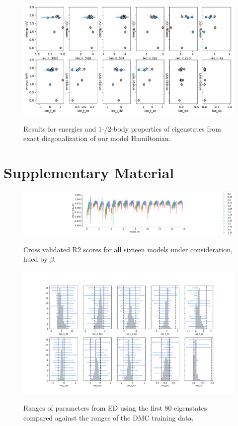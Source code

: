 \documentclass{article}
\begin{document}
\begin{figure}[H]
\centering
\includegraphics[width=\linewidth]{../qwalk/ub3lyp_s1_/analysis/ed_0_log.pdf}
\label{fig:ED}
\caption{Results for energies and 1-/2-body properties of eigenstates from exact diagonalization of our model Hamiltonian.}
\end{figure}

\section{Supplementary Material} 
\begin{figure}[H]
\centering
\includegraphics[width=\linewidth]{../qwalk/ub3lyp_s1_/analysis/r2_test.pdf}
\label{fig:OneParm}
\caption{Cross validated R2 scores for all sixteen models under consideration, hued by $\beta$.}
\end{figure}

\begin{figure}[H]
\centering
\includegraphics[width=\linewidth]{../qwalk/ub3lyp_s1_/analysis/Xerr.pdf}
\label{fig:Xerr}
\caption{Ranges of parameters from ED using the first 80 eigenstates compared against the ranges of the DMC training data.}
\end{figure}
\end{document}
